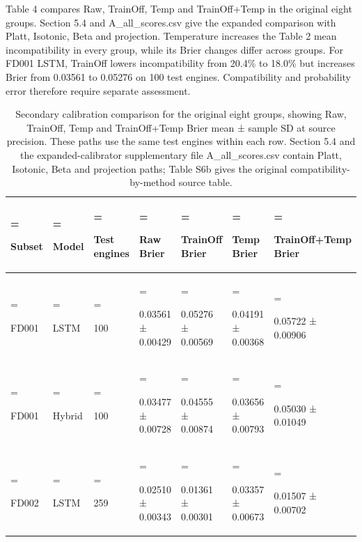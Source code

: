 \documentclass[IJPHM, 2026, 0]{phmsociety}
\begin{document}
Table \mbox{4} compares Raw, TrainOff, Temp and TrainOff+Temp in the original eight groups. Section \mbox{5.4} and A\_\allowbreak{}all\_\allowbreak{}scores.csv give the expanded comparison with Platt, Isotonic, Beta and projection. Temperature increases the Table \mbox{2} mean incompatibility in every group, while its Brier changes differ across groups. For FD001 LSTM, TrainOff lowers incompatibility from \mbox{20.4}\% to \mbox{18.0}\% but increases Brier from \mbox{0.03561} to \mbox{0.05276} on \mbox{100} test engines. Compatibility and probability error therefore require separate assessment.

\begin{table}[t]
\centering
\normalsize
\setlength{\tabcolsep}{3pt}
\renewcommand{\arraystretch}{1.12}
\setcounter{table}{3}
\caption{Secondary calibration comparison for the original eight groups, showing Raw, TrainOff, Temp and TrainOff+Temp Brier mean ± sample SD at source precision. These paths use the same test engines within each row. Section \mbox{5.4} and the expanded-calibrator supplementary file A\_\allowbreak{}all\_\allowbreak{}scores.csv contain Platt, Isotonic, Beta and projection paths; Table S6b gives the original compatibility-by-method source table.}
\label{tab:4}
\begin{tabularx}{\textwidth}{@{}>{\hsize=0.620000\hsize\linewidth=\hsize\raggedright\arraybackslash}X>{\hsize=0.610000\hsize\linewidth=\hsize\raggedright\arraybackslash}X>{\hsize=0.620000\hsize\linewidth=\hsize\raggedright\arraybackslash}X>{\hsize=1.220000\hsize\linewidth=\hsize\raggedright\arraybackslash}X>{\hsize=1.220000\hsize\linewidth=\hsize\raggedright\arraybackslash}X>{\hsize=1.220000\hsize\linewidth=\hsize\raggedright\arraybackslash}X>{\hsize=1.490000\hsize\linewidth=\hsize\raggedright\arraybackslash}X@{}}
\toprule
Subset & Model & Test engines & Raw Brier & TrainOff Brier & Temp Brier & TrainOff+Temp Brier \\
\midrule
FD001 & LSTM & \mbox{100} & \mbox{0.03561} ± \mbox{0.00429} & \mbox{0.05276} ± \mbox{0.00569} & \mbox{0.04191} ± \mbox{0.00368} & \mbox{0.05722} ± \mbox{0.00906} \\
FD001 & Hybrid & \mbox{100} & \mbox{0.03477} ± \mbox{0.00728} & \mbox{0.04555} ± \mbox{0.00874} & \mbox{0.03656} ± \mbox{0.00793} & \mbox{0.05030} ± \mbox{0.01049} \\
FD002 & LSTM & \mbox{259} & \mbox{0.02510} ± \mbox{0.00343} & \mbox{0.01361} ± \mbox{0.00301} & \mbox{0.03357} ± \mbox{0.00673} & \mbox{0.01507} ± \mbox{0.00702} \\

\end{tabularx}
\end{table}
\end{document}
